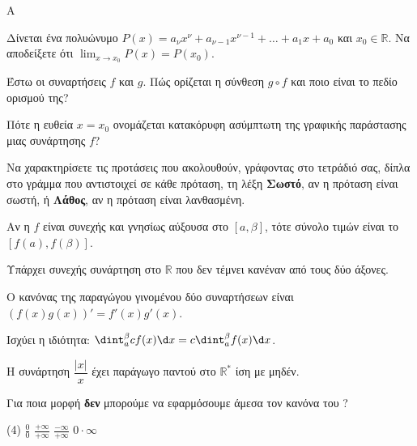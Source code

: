 \begin{thema}{A}
\begin{erwthma}
    \item Δίνεται ένα πολυώνυμο $ P(x)=a_\nu x^\nu+a_{\nu-1}x^{\nu-1}+\ldots+a_1x+a_0 $ και $ x_0\in\mathbb{R} $. Να αποδείξετε ότι $ {\displaystyle{\lim_{x\to x_0}{P(x)}=P(x_0)}} $.
    \item Έστω οι συναρτήσεις $f$ και $g$. Πώς ορίζεται η σύνθεση $g \circ f$ και ποιο είναι το πεδίο ορισμού της?
    \item Πότε η ευθεία $x=x_0$ ονομάζεται κατακόρυφη ασύμπτωτη της γραφικής παράστασης μιας συνάρτησης $f$?
    \item Να χαρακτηρίσετε τις προτάσεις που ακολουθούν, γράφοντας στο τετράδιό σας, δίπλα στο γράμμα που αντιστοιχεί σε κάθε πρόταση, τη λέξη \textbf{Σωστό}, αν η πρόταση είναι σωστή, ή \textbf{Λάθος}, αν η πρόταση είναι λανθασμένη.
    \begin{alist}
        \item Αν η $f$ είναι συνεχής και γνησίως αύξουσα στο $[a, \beta]$, τότε σύνολο τιμών είναι το $[f(a), f(\beta)]$.
        \item Υπάρχει συνεχής συνάρτηση στο $\mathbb{R}$ που δεν τέμνει κανέναν από τους δύο άξονες.
        \item O κανόνας της παραγώγου γινομένου δύο συναρτήσεων είναι $(f(x)g(x))' = f'(x)g'(x)$.
        \item Ισχύει η ιδιότητα: $\dint_a^\beta c f(x) \d x = c \dint_a^\beta f(x) \d x$.
        \item Η συνάρτηση $\dfrac{|x|}{x}$ έχει παράγωγο παντού στο $\mathbb{R}^*$ ίση με μηδέν.
    \end{alist}
    \item Για ποια μορφή \textbf{δεν} μπορούμε να εφαρμόσουμε άμεσα τον κανόνα του ?
    \begin{tasks}[label=\let\textdexiakeraia\relax\alph*.](4)
        \task $\frac{0}{0}$
        \task $\frac{+\infty}{+\infty}$
        \task $\frac{-\infty}{+\infty}$
        \task $0 \cdot \infty$
    \end{tasks}
\end{erwthma}
\end{thema}


